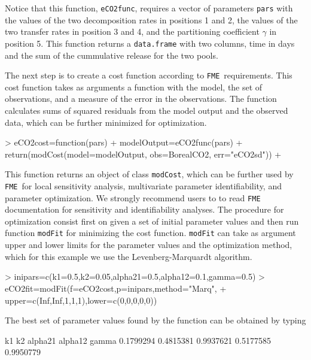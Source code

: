 \documentclass[a4paper]{article}
\newcommand{\FME}{\texttt{FME}}
\begin{document}
Notice that this function, {\tt eCO2func}, requires a vector of parameters {\tt pars} with the values of the two decomposition rates in positions 1 and 2, the values of the two transfer rates in position 3 and 4, and the partitioning coefficient $\gamma$ in position 5. This function returns a {\tt data.frame} with two columns, time in days and the sum of the cummulative release for the two pools. 

The next step is to create a cost function according to \FME \, requirements. This cost function takes as arguments a function with the model, the set of observations, and a measure of the error in the observations. The function calculates sums of squared residuals from the model output and the observed data, which can be further minimized for optimization. 

\begin{Schunk}
\begin{Sinput}
> eCO2cost=function(pars){
+   modelOutput=eCO2func(pars)
+   return(modCost(model=modelOutput, obs=BorealCO2, err="eCO2sd"))
+ }
\end{Sinput}
\end{Schunk}

This function returns an object of class {\tt modCost}, which can be further used by \FME \, for local sensitivity analysis, multivariate parameter identifiability, and parameter optimization. We strongly recommend users to to read \FME \, documentation for sensitivity and identifiability analyses. The procedure for optimization consist first on given a set of initial parameter values and then run function {\tt modFit} for minimizing the cost function. {\tt modFit} can take as argument upper and lower limits for the parameter values and the optimization method, which for this example we use the Levenberg-Marquardt algorithm.


\begin{Schunk}
\begin{Sinput}
> inipars=c(k1=0.5,k2=0.05,alpha21=0.5,alpha12=0.1,gamma=0.5)
> eCO2fit=modFit(f=eCO2cost,p=inipars,method="Marq",
+                upper=c(Inf,Inf,1,1,1),lower=c(0,0,0,0,0))
\end{Sinput}
\end{Schunk}

The best set of parameter values found by the function can be obtained by typing
\begin{Schunk}
\begin{Soutput}
       k1        k2   alpha21   alpha12     gamma 
0.1799294 0.4815381 0.9937621 0.5177585 0.9950779 
\end{Soutput}
\end{Schunk}
\end{document}
